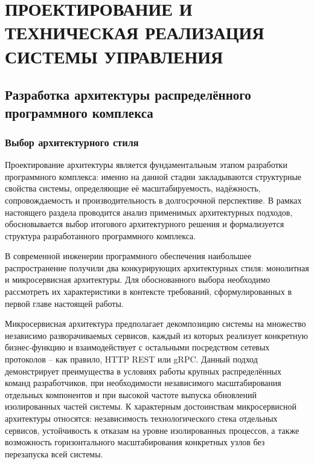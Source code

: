 \chapter{{\fontsize{14pt}{21pt}\selectfont\MakeUppercase{ПРОЕКТИРОВАНИЕ И ТЕХНИЧЕСКАЯ РЕАЛИЗАЦИЯ СИСТЕМЫ УПРАВЛЕНИЯ}}}
\label{cha:design}

\section{Разработка архитектуры распределённого программного комплекса}

\subsection{Выбор архитектурного стиля}

Проектирование архитектуры является фундаментальным этапом разработки программного комплекса: именно на данной стадии закладываются структурные свойства системы, определяющие её масштабируемость, надёжность, сопровождаемость и производительность в долгосрочной перспективе. В рамках настоящего раздела проводится анализ применимых архитектурных подходов, обосновывается выбор итогового архитектурного решения и формализуется структура разработанного программного комплекса.

В современной инженерии программного обеспечения наибольшее распространение получили два конкурирующих архитектурных стиля: монолитная и микросервисная архитектуры. Для обоснованного выбора необходимо рассмотреть их характеристики в контексте требований, сформулированных в первой главе настоящей работы.

Микросервисная архитектура предполагает декомпозицию системы на множество независимо разворачиваемых сервисов, каждый из которых реализует конкретную бизнес-функцию и взаимодействует с остальными посредством сетевых протоколов -- как правило, HTTP REST или gRPC. Данный подход демонстрирует преимущества в условиях работы крупных распределённых команд разработчиков, при необходимости независимого масштабирования отдельных компонентов и при высокой частоте выпуска обновлений изолированных частей системы. К характерным достоинствам микросервисной архитектуры относятся: независимость технологического стека отдельных сервисов, устойчивость к отказам на уровне изолированных процессов, а также возможность горизонтального масштабирования конкретных узлов без перезапуска всей системы.

